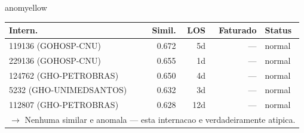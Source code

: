 \documentclass[a4paper,10pt]{article}
\begin{document}
\begin{anomalycard}[Internacao 119168 | GHO-BRADESCO | MODERADO (z=2.25)]{anomyellow}
\begin{tabular}{l r r r l}\toprule\textbf{Intern.} & \textbf{Simil.} & \textbf{LOS} & \textbf{Faturado} & \textbf{Status} \\\midrule
119136 (GOHOSP-CNU) & 0.672 & 5d & --- & \textcolor{jcubeblue}{normal} \\
229136 (GOHOSP-CNU) & 0.655 & 1d & --- & \textcolor{jcubeblue}{normal} \\
124762 (GHO-PETROBRAS) & 0.650 & 4d & --- & \textcolor{jcubeblue}{normal} \\
5232 (GHO-UNIMEDSANTOS) & 0.632 & 3d & --- & \textcolor{jcubeblue}{normal} \\
112807 (GHO-PETROBRAS) & 0.628 & 12d & --- & \textcolor{jcubeblue}{normal} \\
\multicolumn{5}{l}{\textcolor{jcubeblue}{\small $\rightarrow$ Nenhuma similar e anomala --- esta internacao e verdadeiramente atipica.}} \\
\bottomrule\end{tabular}


\end{anomalycard}

\newpage
\end{document}
